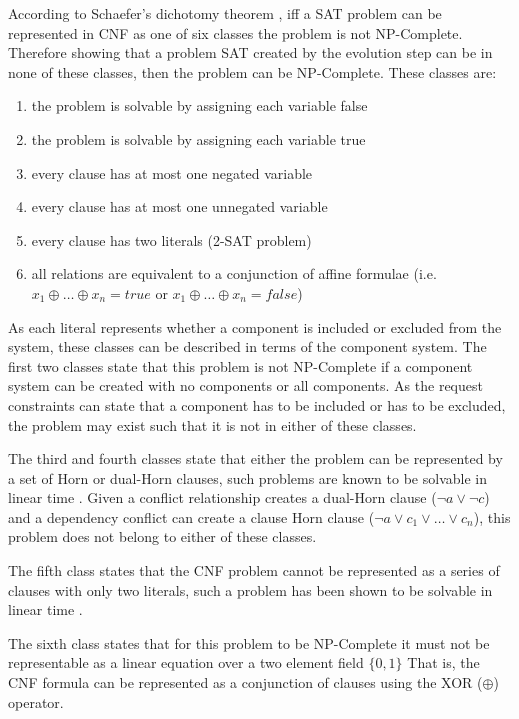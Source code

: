 According to Schaefer's dichotomy theorem \cite{Schaefer1978}, iff a SAT problem can be represented in CNF as one of six classes the problem is not NP-Complete.
Therefore showing that a problem SAT created by the evolution step can be in none of these classes, then the problem can be NP-Complete.
These classes are:
\begin{enumerate}
  \item the problem is solvable by assigning each variable false
  \item the problem is solvable by assigning each variable true
  \item every clause has at most one negated variable
  \item every clause has at most one unnegated variable
  \item every clause has two literals (2-SAT problem)
  \item all relations are equivalent to a conjunction of affine formulae (i.e. $x_1 \oplus \ldots \oplus x_n = true$ or $x_1 \oplus \ldots \oplus x_n = false$)
\end{enumerate} 

As each literal represents whether a component is included or excluded from the system, these classes can be described in terms of the component system.
The first two classes state that this problem is not NP-Complete if a component system can be created with no components or all components.
As the request constraints can state that a component has to be included or has to be excluded, the problem may exist such that it is not in either of these classes.  

The third and fourth classes state that either the problem can be represented by a set of Horn or dual-Horn clauses, such problems are known to be solvable in linear time \cite{dowling1984linear}.
Given a conflict relationship creates a dual-Horn clause ($\neg a \vee \neg c$) and a dependency conflict can create a clause Horn clause ($\neg a \vee c_1 \vee \ldots \vee c_n$), 
this problem does not belong to either of these classes.

The fifth class states that the CNF problem cannot be represented as a series of clauses with only two literals,
such a problem has been shown to be solvable in linear time \citep{aspvall1979linear}.

The sixth class states that for this problem to be NP-Complete it must not be representable as a linear equation over a two element field $\{0,1\}$
That is, the CNF formula can be represented as a conjunction of clauses using the XOR ($\oplus$) operator.
 
